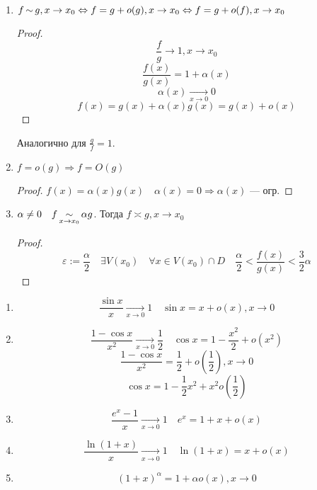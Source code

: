     \begin{consequence}
        \begin{enumerate}
            \item $f\operatorname*{\sim} g, x\to x_0 \Leftrightarrow f=g+o(g), x\to x_0 \Leftrightarrow f=g+o(f), x\to x_0$
            \begin{proof}
                $$\frac{f}{g}\to1, x\to x_0$$
                $$\frac{f(x)}{g(x)}=1+\alpha(x)$$
                $$\alpha(x)\xrightarrow[x\to0]{} 0$$
                $$f(x)=g(x)+\alpha(x)g(x)=g(x)+o(x)$$
            \end{proof}
            Аналогично для $\frac{g}{f}=1$.

            \item $f=o(g) \Rightarrow f=O(g)$
            \begin{proof}
                $f(x)=\alpha(x)g(x) \quad \alpha(x)=0\Rightarrow \alpha(x)$ --- огр.
            \end{proof}
            \item $\alpha\not=0 \quad f\operatorname*{\sim}\limits_{x\to x_0}\alpha g$. Тогда $f\asymp g, x\to x_0$
            \begin{proof}
                $$\varepsilon:=\frac{\alpha}{2} \quad \exists V(x_0) \quad \forall x\in V(x_0)\cap D \quad \frac{\alpha}{2}<\frac{f(x)}{g(x)}<\frac{3}{2}\alpha$$
            \end{proof}
        \end{enumerate}
    \end{consequence}
    \begin{example}
        \begin{enumerate}
            \item $$\frac{\sin x}{x}\xrightarrow[x\to0]{} 1 \quad \sin x = x + o(x), x\to 0$$
            \item $$\frac{1 - \cos x}{x^2}\xrightarrow[x\to0]{} \frac{1}{2} \quad \cos x = 1-\frac{x^2}{2}+o(x^2)$$
            $$\frac{1-\cos x}{x^2}=\frac{1}{2}+o(\frac{1}{2}), x\to 0$$
            $$\cos x=1-\frac{1}{2}x^2+x^2o(\frac{1}{2})$$
            \item $$\frac{e^x-1}{x}\xrightarrow[x\to0]{} 1 \quad e^x=1+x+o(x)$$
            \item $$\frac{\ln(1+x)}{x}\xrightarrow[x\to0]{} 1 \quad \ln(1+x)=x+o(x)$$
            \item $$(1+x)^\alpha=1+\alpha o(x), x\to 0$$
        \end{enumerate}
    \end{example}
